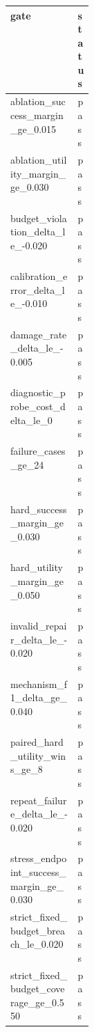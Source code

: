 \begin{tabular}{lp{0.14\linewidth}}
\toprule
gate & status \\
\midrule
ablation\_success\_margin\_ge\_0.015 & pass \\
ablation\_utility\_margin\_ge\_0.030 & pass \\
budget\_violation\_delta\_le\_-0.020 & pass \\
calibration\_error\_delta\_le\_-0.010 & pass \\
damage\_rate\_delta\_le\_-0.005 & pass \\
diagnostic\_probe\_cost\_delta\_le\_0 & pass \\
failure\_cases\_ge\_24 & pass \\
hard\_success\_margin\_ge\_0.030 & pass \\
hard\_utility\_margin\_ge\_0.050 & pass \\
invalid\_repair\_delta\_le\_-0.020 & pass \\
mechanism\_f1\_delta\_ge\_0.040 & pass \\
paired\_hard\_utility\_wins\_ge\_8 & pass \\
repeat\_failure\_delta\_le\_-0.020 & pass \\
stress\_endpoint\_success\_margin\_ge\_0.030 & pass \\
strict\_fixed\_budget\_breach\_le\_0.020 & pass \\
strict\_fixed\_budget\_coverage\_ge\_0.550 & pass \\
\bottomrule
\end{tabular}
